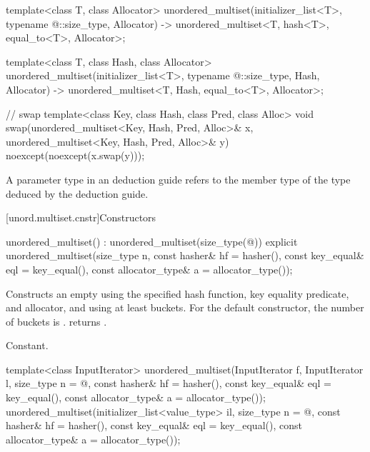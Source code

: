 \begin{codeblock}
{  template<class T, class Allocator>
    unordered_multiset(initializer_list<T>, typename @\seebelow@::size_type, Allocator)
      -> unordered_multiset<T, hash<T>, equal_to<T>, Allocator>;

  template<class T, class Hash, class Allocator>
    unordered_multiset(initializer_list<T>, typename @\seebelow@::size_type, Hash, Allocator)
      -> unordered_multiset<T, Hash, equal_to<T>, Allocator>;

  // swap
  template<class Key, class Hash, class Pred, class Alloc>
    void swap(unordered_multiset<Key, Hash, Pred, Alloc>& x,
              unordered_multiset<Key, Hash, Pred, Alloc>& y)
      noexcept(noexcept(x.swap(y)));
}
\end{codeblock}

\pnum
A  parameter type in an  deduction guide
refers to the  member type of
the type deduced by the deduction guide.

[unord.multiset.cnstr]{Constructors}

%
\begin{itemdecl}
unordered_multiset() : unordered_multiset(size_type(@\seebelow@)) { }
explicit unordered_multiset(size_type n,
                            const hasher& hf = hasher(),
                            const key_equal& eql = key_equal(),
                            const allocator_type& a = allocator_type());
\end{itemdecl}

\begin{itemdescr}
\pnum
\effects Constructs an empty  using the
specified hash function, key equality predicate, and allocator, and
using at least  buckets.  For the default constructor,
the number of buckets is .
 returns .

\pnum
\complexity Constant.
\end{itemdescr}

%
\begin{itemdecl}
template<class InputIterator>
  unordered_multiset(InputIterator f, InputIterator l,
                     size_type n = @\seebelow@,
                     const hasher& hf = hasher(),
                     const key_equal& eql = key_equal(),
                     const allocator_type& a = allocator_type());
unordered_multiset(initializer_list<value_type> il,
                   size_type n = @\seebelow@,
                   const hasher& hf = hasher(),
                   const key_equal& eql = key_equal(),
                   const allocator_type& a = allocator_type());
\end{itemdecl}

